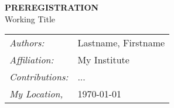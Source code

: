 \thispagestyle{plain}
\begin{titlepage}


\vspace{2cm}

\begin{center}

\LARGE{\textbf{\uppercase{Preregistration}}}\\
\LARGE{Working Title}\\

\vspace{5cm}

\normalsize
\begin{tabular}{p{3cm}p{8.4cm}}\\
\textit{Authors:}  & \quad Lastname, Firstname\\%
\textit{Affiliation:}  & \quad My Institute\\ \rule{0pt}{1cm}%
\textit{Contributions:}  & \quad ...\\ \rule{0pt}{1.5cm}%
\textit{My Location, } & \quad \today\\
\end{tabular}

\end{center}


\end{titlepage}